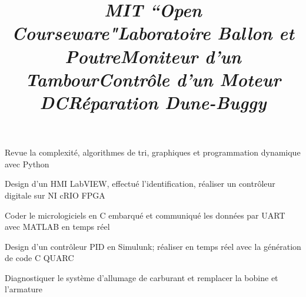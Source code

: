 \documentclass[mm]{res}
\begin{document}
\begin{resume}
\title{\textsl{MIT ``Open Courseware"}}
\begin{position}
\tb Revue la complexit\'e, algorithmes de tri, graphiques et programmation dynamique avec Python
\end{position}

\title{\textsl{Laboratoire Ballon et Poutre}}
\begin{position}
\tb Design d'un HMI LabVIEW, effectu\'e l'identification, r\'ealiser un contr\^oleur digitale sur NI cRIO FPGA
\end{position}

\title{\textsl{Moniteur d'un Tambour}}
\begin{position}
\tb Coder le micrologiciels en C embarqu\'e et communiqu\'e les donn\'ees par UART avec MATLAB en temps r\'eel
\end{position}


\title{\textsl{Contr\^ole d'un Moteur DC}}
\begin{position}
\tb Design d'un contr\^oleur PID en Simulunk; r\'ealiser en temps r\'eel avec la g\'en\'eration de code C QUARC
\end{position}

\title{\textsl{R\'eparation Dune-Buggy}}
\begin{position}
\tb Diagnostiquer le syst\`eme d'allumage de carburant et remplacer la bobine et l'armature
\end{position}


\toprule


\end{resume}
\end{document}
